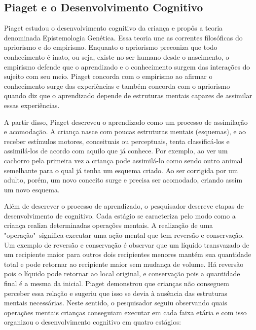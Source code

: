 
\subsection{Piaget e o Desenvolvimento Cognitivo}
Piaget estudou o desenvolvimento cognitivo da criança e propôs a teoria denominada Epistemologia Genética. Essa teoria une as correntes filosóficas do apriorismo e do empirismo. Enquanto o apriorismo preconiza que todo conhecimento é inato, ou seja, existe no ser humano desde o nascimento, o empirismo defende que o aprendizado e o conhecimento surgem das interações do sujeito com seu meio. Piaget concorda com o empirismo ao afirmar o conhecimento surge das experiências e também concorda com o apriorismo quando diz que o aprendizado depende de estruturas mentais capazes de assimilar essas experiências.

A partir disso, Piaget descreveu o aprendizado como um processo de assimilação e acomodação. A criança nasce com poucas estruturas mentais (esquemas), e ao receber estímulos motores, conceituais ou perceptuais, tenta classificá-los e assimilá-los de acordo com aquilo que já conhece. Por exemplo, ao ver um cachorro pela primeira vez a criança pode assimilá-lo como sendo outro animal semelhante para o qual já tenha um esquema criado. Ao ser corrigida por um adulto, porém, um novo conceito surge e precisa ser acomodado, criando assim um novo esquema.

Além de descrever o processo de aprendizado, o pesquisador descreve etapas de desenvolvimento de cognitivo. Cada estágio se caracteriza pelo modo como a criança realiza determinadas operações mentais. A realização de uma "operação"\ significa executar uma ação mental que tem reversão e conservação. Um exemplo de reversão e conservação é observar que um líquido transvazado de um recipiente maior para outros dois recipientes menores mantém sua quantidade total e pode retornar ao recipiente maior sem mudança de volume. Há reversão pois o líquido pode retornar ao local original, e conservação pois a quantidade final é a mesma da inicial. Piaget demonstrou que crianças não conseguem perceber essa relação e sugeriu que isso se devia à ausência das estruturas mentais necessárias. Neste sentido, o pesquisador seguiu observando quais operações mentais crianças conseguiam executar em cada faixa etária e com isso organizou o desenvolvimento cognitivo em quatro estágios:

